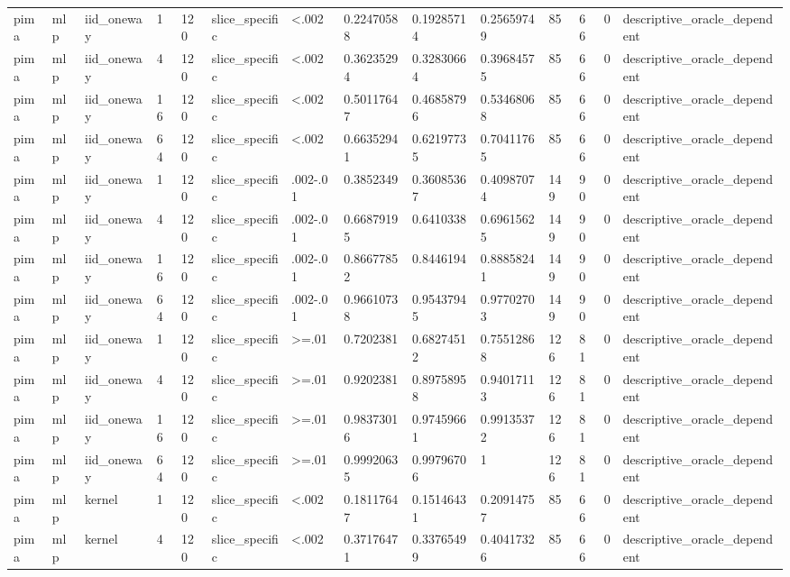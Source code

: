 \begin{tabular}{llllllllllllll}
pima & mlp & iid\_oneway & 1 & 120 & slice\_specific & <.002 & 0.22470588 & 0.19285714 & 0.25659749 & 85 & 66 & 0 & descriptive\_oracle\_dependent \\
pima & mlp & iid\_oneway & 4 & 120 & slice\_specific & <.002 & 0.36235294 & 0.32830664 & 0.39684575 & 85 & 66 & 0 & descriptive\_oracle\_dependent \\
pima & mlp & iid\_oneway & 16 & 120 & slice\_specific & <.002 & 0.50117647 & 0.46858796 & 0.53468068 & 85 & 66 & 0 & descriptive\_oracle\_dependent \\
pima & mlp & iid\_oneway & 64 & 120 & slice\_specific & <.002 & 0.66352941 & 0.62197735 & 0.70411765 & 85 & 66 & 0 & descriptive\_oracle\_dependent \\
pima & mlp & iid\_oneway & 1 & 120 & slice\_specific & .002-.01 & 0.3852349 & 0.36085367 & 0.40987074 & 149 & 90 & 0 & descriptive\_oracle\_dependent \\
pima & mlp & iid\_oneway & 4 & 120 & slice\_specific & .002-.01 & 0.66879195 & 0.6410338 & 0.69615625 & 149 & 90 & 0 & descriptive\_oracle\_dependent \\
pima & mlp & iid\_oneway & 16 & 120 & slice\_specific & .002-.01 & 0.86677852 & 0.8446194 & 0.88858241 & 149 & 90 & 0 & descriptive\_oracle\_dependent \\
pima & mlp & iid\_oneway & 64 & 120 & slice\_specific & .002-.01 & 0.96610738 & 0.95437945 & 0.97702703 & 149 & 90 & 0 & descriptive\_oracle\_dependent \\
pima & mlp & iid\_oneway & 1 & 120 & slice\_specific & >=.01 & 0.7202381 & 0.68274512 & 0.75512868 & 126 & 81 & 0 & descriptive\_oracle\_dependent \\
pima & mlp & iid\_oneway & 4 & 120 & slice\_specific & >=.01 & 0.9202381 & 0.89758958 & 0.94017113 & 126 & 81 & 0 & descriptive\_oracle\_dependent \\
pima & mlp & iid\_oneway & 16 & 120 & slice\_specific & >=.01 & 0.98373016 & 0.97459661 & 0.99135372 & 126 & 81 & 0 & descriptive\_oracle\_dependent \\
pima & mlp & iid\_oneway & 64 & 120 & slice\_specific & >=.01 & 0.99920635 & 0.99796706 & 1 & 126 & 81 & 0 & descriptive\_oracle\_dependent \\
pima & mlp & kernel & 1 & 120 & slice\_specific & <.002 & 0.18117647 & 0.15146431 & 0.20914757 & 85 & 66 & 0 & descriptive\_oracle\_dependent \\
pima & mlp & kernel & 4 & 120 & slice\_specific & <.002 & 0.37176471 & 0.33765499 & 0.40417326 & 85 & 66 & 0 & descriptive\_oracle\_dependent \\

\end{tabular}
